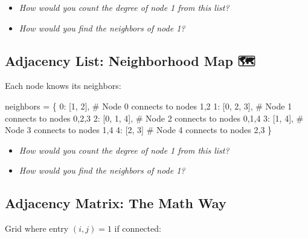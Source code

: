 \documentclass[
  letterpaper,
  DIV=11,
  numbers=noendperiod,
  oneside]{scrartcl}
\newenvironment{Shaded}{}{}
\newcommand{\CommentTok}[1]{\textcolor[rgb]{0.42,0.45,0.49}{#1}}
\newcommand{\DecValTok}[1]{\textcolor[rgb]{0.00,0.36,0.77}{#1}}
\newcommand{\NormalTok}[1]{\textcolor[rgb]{0.14,0.16,0.18}{#1}}
\newcommand{\OperatorTok}[1]{\textcolor[rgb]{0.14,0.16,0.18}{#1}}
\providecommand{\tightlist}{%
  \setlength{\itemsep}{0pt}\setlength{\parskip}{0pt}}
\begin{document}
\begin{itemize}
\tightlist
\item
  \emph{How would you count the degree of node 1 from this list?}
\item
  \emph{How would you find the neighbors of node 1?}
\end{itemize}

\subsection{Adjacency List: Neighborhood Map
🗺️}\label{adjacency-list-neighborhood-map}

Each node knows its neighbors:

\begin{Shaded}
\begin{Highlighting}[]
\NormalTok{neighbors }\OperatorTok{=}\NormalTok{ \{}
    \DecValTok{0}\NormalTok{: [}\DecValTok{1}\NormalTok{, }\DecValTok{2}\NormalTok{],     }\CommentTok{\# Node 0 connects to nodes 1,2}
    \DecValTok{1}\NormalTok{: [}\DecValTok{0}\NormalTok{, }\DecValTok{2}\NormalTok{, }\DecValTok{3}\NormalTok{],  }\CommentTok{\# Node 1 connects to nodes 0,2,3}
    \DecValTok{2}\NormalTok{: [}\DecValTok{0}\NormalTok{, }\DecValTok{1}\NormalTok{, }\DecValTok{4}\NormalTok{],  }\CommentTok{\# Node 2 connects to nodes 0,1,4}
    \DecValTok{3}\NormalTok{: [}\DecValTok{1}\NormalTok{, }\DecValTok{4}\NormalTok{],     }\CommentTok{\# Node 3 connects to nodes 1,4}
    \DecValTok{4}\NormalTok{: [}\DecValTok{2}\NormalTok{, }\DecValTok{3}\NormalTok{]      }\CommentTok{\# Node 4 connects to nodes 2,3}
\NormalTok{\}}
\end{Highlighting}
\end{Shaded}

\begin{itemize}
\tightlist
\item
  \emph{How would you count the degree of node 1 from this list?}
\item
  \emph{How would you find the neighbors of node 1?}
\end{itemize}

\subsection{Adjacency Matrix: The Math Way
📐}\label{adjacency-matrix-the-math-way}

Grid where entry \((i,j) = 1\) if connected:
\end{document}
